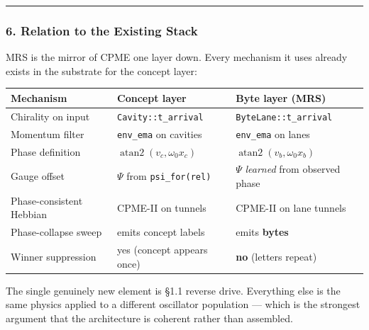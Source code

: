 \documentclass[
  11pt,
  a4paper,
]{article}
\begin{document}
\begin{center}\rule{0.5\linewidth}{0.5pt}\end{center}

\subsubsection{6. Relation to the Existing
Stack}\label{relation-to-the-existing-stack-1}

MRS is the mirror of CPME one layer down. Every mechanism it uses
already exists in the substrate for the concept layer:

\begin{longtable}[]{@{}
  >{\raggedright\arraybackslash}p{}
  >{\raggedright\arraybackslash}p{}
  >{\raggedright\arraybackslash}p{}@{}}
\toprule\noalign{}
\begin{minipage}[b]{\linewidth}\raggedright
Mechanism
\end{minipage} & \begin{minipage}[b]{\linewidth}\raggedright
Concept layer
\end{minipage} & \begin{minipage}[b]{\linewidth}\raggedright
Byte layer (MRS)
\end{minipage} \\
\midrule\noalign{}
\endhead
\bottomrule\noalign{}
\endlastfoot
Chirality on input & \texttt{Cavity::t\_arrival} &
\texttt{ByteLane::t\_arrival} \\
Momentum filter & \texttt{env\_ema} on cavities & \texttt{env\_ema} on
lanes \\
Phase definition & \(\operatorname{atan2}(v_c, \omega_0 x_c)\) &
\(\operatorname{atan2}(v_b, \omega_0 x_b)\) \\
Gauge offset & \(\Psi\) from \texttt{psi\_for(rel)} & \(\Psi\)
\emph{learned} from observed phase \\
Phase-consistent Hebbian & CPME-II on tunnels & CPME-II on lane
tunnels \\
Phase-collapse sweep & emits concept labels & emits \textbf{bytes} \\
Winner suppression & yes (concept appears once) & \textbf{no} (letters
repeat) \\
\end{longtable}

The single genuinely new element is §1.1 reverse drive. Everything else
is the same physics applied to a different oscillator population ---
which is the strongest argument that the architecture is coherent rather
than assembled.
\end{document}
